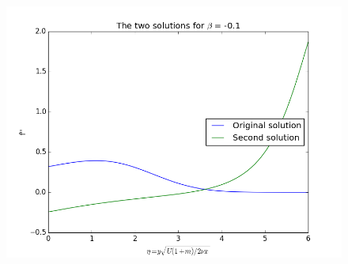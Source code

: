 \documentclass[a4paper,english,11pt,twoside]{article}
\begin{document}
\begin{figure}[h!]
\includegraphics[scale=0.7]{1b_figure_2.png}
\end{figure}
\end{document}
